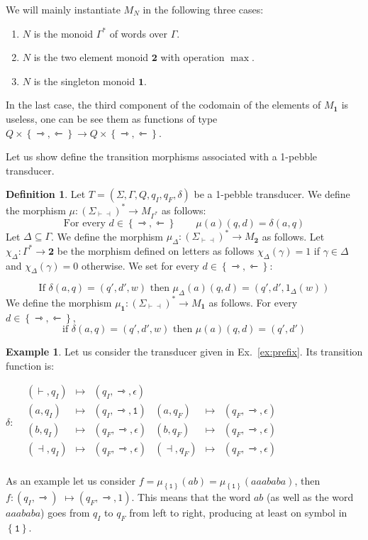\documentclass{article}
\newcommand{\set}[1]{\left\{#1 \right\}}
\newcommand{\mleft}{\leftarrowtriangle}
\newcommand{\mright}{\rightarrowtriangle}
\theoremstyle{definition}
\newtheorem{definition}[theorem]{Definition}
\newtheorem{example}[theorem]{Example}
\theoremstyle{remark}
\begin{document}
We will mainly instantiate $M_N$ in the following three cases: 
\begin{enumerate}
\item $N$ is the monoid $\Gamma^*$ of words over $\Gamma$.
\item $N$ is the two element monoid $\mathbf 2$ with operation $\max$.
\item $N$ is the singleton monoid $\mathbf 1$.
\end{enumerate}
In the last case, the third component of the codomain of the elements of $M_{\mathbf 1}$ is useless, one can be see them as functions of type $Q\times\set{\mright,\mleft}\to Q\times\set{\mright,\mleft}$.


Let us show define the transition morphisms associated with a 1-pebble transducer.
\begin{definition}
Let $T=(\Sigma, \Gamma, Q, q_I, q_F, \delta)$ be a 1-pebble transducer. 
We define the morphism $\mu:(\Sigma_{\vdash\dashv})^*\to M_{\Gamma^*}$ as follows:
$$\text{For every } d\in \set{\mright,\mleft}\qquad\mu(a)(q,d)=\delta(a,q)$$
Let $\Delta\subseteq \Gamma$. We define the morphism $\mu_\Delta:(\Sigma_{\vdash\dashv})^*\to M_{\mathbf 2}$ as follows. Let $\chi_\Delta:\Gamma^*\to \mathbf{2}$ be the morphism defined on letters as follows $\chi_\Delta(\gamma)=1$ if $\gamma\in \Delta$ and $\chi_\Delta(\gamma)=0$ otherwise. We set for every $d\in\set{\mright,\mleft}$: 

$$\text{If } \delta(a,q)=(q',d',w) \text{ then } \mu_\Delta(a)(q,d)=(q',d',1_\Delta(w))$$
We define the morphism $\mu_{\mathbf{1}}:(\Sigma_{\vdash\dashv})^*\to M_{\mathbf 1}$ as follows. For every $d\in\set{\mright,\mleft}$,
$$\text{if } \delta(a,q)=(q',d',w) \text{ then }  \mu(a)(q,d)=(q',d') $$
\end{definition} 

\begin{example}
    Let us consider the transducer given in Ex.~\ref{ex:prefix}.
    Its transition function is:

    $\delta: \begin{array}{crclrcl}
        &(\vdash,q_I) &\mapsto& (q_I,\mright,\epsilon) \\
        &(a,q_I)& \mapsto& (q_I,\mright,\mathtt{1}) & (a,q_F)& \mapsto& (q_F,\mright,\epsilon)\\
        &(b,q_I)& \mapsto& (q_F,\mright,\epsilon) & (b,q_F)& \mapsto & (q_F,\mright,\epsilon)\\
        &(\dashv,q_I)& \mapsto& (q_F,\mright,\epsilon) & (\dashv,q_F)& \mapsto & (q_F,\mright,\epsilon)\\
    \end{array}$

\noindent As an example let us consider $f=\mu_{\set{\mathtt 1}}(ab)=\mu_{\set{\mathtt 1}}(aaababa)$, then $f: (q_I,\mright)$ $\mapsto (q_F,\mright,1)$. This means that the word $ab$ (as well as the word $aaababa$) goes from $q_I$ to $q_F$ from left to right, producing at least on symbol in $\set{\mathtt 1}$.
\end{example}
\end{document}
